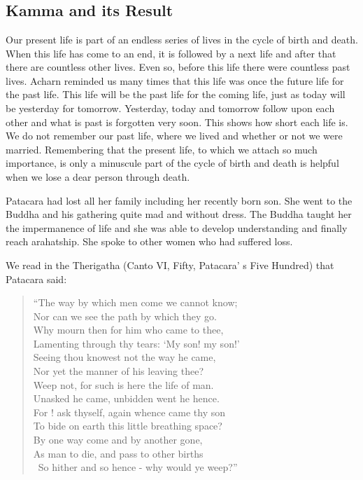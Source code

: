 \chapter[Kamma and its Result]{}
\section*{Kamma and its Result}

Our present life is part of an endless series of lives in the cycle of birth and 
death. When this life has come to an end, it is followed by a next life and after 
that there are countless other lives. Even so, before this life there were countless 
past lives. Acharn reminded us many times that this life was once the future life 
for the past life. This life will be the past life for the coming life, just as today 
will be yesterday for tomorrow. Yesterday, today and tomorrow follow upon 
each other and what is past is forgotten very soon. This shows how short each 
life is. We do not remember our past life, where we lived and whether or not we 
were married. Remembering that the present life, to which we attach so much 
importance, is only a minuscule part of the cycle of birth and death is helpful 
when we lose a dear person through death. 

Patacara had lost all her family including her recently born son. She went to the 
Buddha and his gathering quite mad and without dress. The Buddha taught her 
the impermanence of life and she was able to develop understanding and finally 
reach arahatship. She spoke to other women who had suffered loss. 

We read in the Therigatha (Canto VI, Fifty, Patacara' s Five Hundred) that 
Patacara said: 

\begin{verse}

``The way by which men come we cannot know; \\
Nor can we see the path by which they go. \\
Why mourn then for him who came to thee, \\
Lamenting through thy tears: `My son! my son!'\\
Seeing thou knowest not the way he came, \\
Nor yet the manner of his leaving thee? \\
Weep not, for such is here the life of man. \\
Unasked he came, unbidden went he hence. \\
For ! ask thyself, again whence came thy son \\
To bide on earth this little breathing space? \\
By one way come and by another gone,\\ 
As man to die, and pass to other births\\\ 
So hither and so hence - why would ye weep?''

\end{verse}

